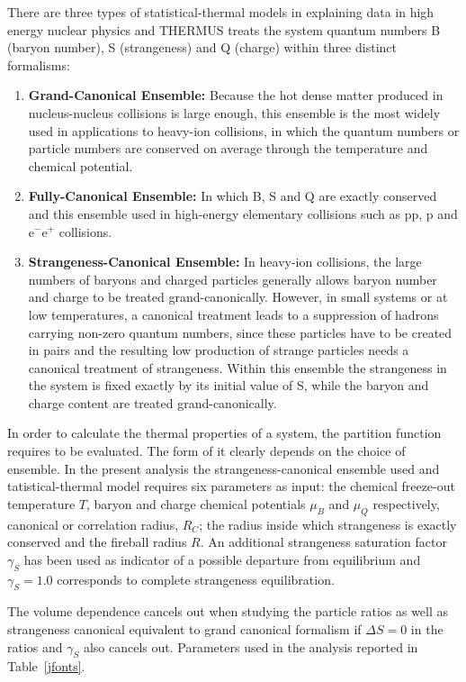 There are three types of statistical-thermal models in explaining data in high energy nuclear physics and THERMUS treats the system quantum numbers B (baryon number), S (strangeness) and Q (charge) within three distinct formalisms: 

\begin{enumerate}
\item \textbf{Grand-Canonical Ensemble:} Because the hot dense matter produced in nucleus-nucleus collisions is large enough, this ensemble is the most widely used in applications to heavy-ion collisions, in which the quantum numbers or particle numbers are conserved on average through the temperature and chemical potential.

\item \textbf{Fully-Canonical Ensemble:} In which B, S and Q are exactly conserved and this ensemble used in high-energy elementary collisions such as pp, p\pbar{} and e$^{-}$e$^{+}$ collisions.

\item \textbf{Strangeness-Canonical Ensemble:} In heavy-ion collisions, the large numbers of baryons and charged particles generally allows baryon number and charge to be treated grand-canonically. However, in small systems or at low temperatures, a canonical treatment leads to a suppression of hadrons carrying non-zero quantum numbers, since these particles have to be created in pairs and the resulting low production of strange particles needs a canonical treatment of strangeness. Within this ensemble the strangeness in the system is fixed exactly by its initial value of S, while the baryon and charge content are treated grand-canonically.


 \end{enumerate}
 In order to calculate the thermal properties of a system, the partition function requires to be evaluated. The form of it clearly depends on the choice of ensemble. 
 In the present analysis the strangeness-canonical ensemble used and tatistical-thermal model requires six parameters as input: the chemical freeze-out temperature $T$, baryon and charge chemical potentials $\mu_{B}$ and $\mu_{Q}$ respectively, canonical or correlation radius, $R_{C}$; the radius inside which strangeness is exactly conserved and the fireball radius $R$. An additional strangeness saturation factor $\gamma_{S}$ has been used as indicator of a possible departure from equilibrium and $\gamma_{S}=1.0$ corresponds to complete strangeness equilibration.
 

The volume dependence cancels out when studying the particle ratios as well as strangeness canonical equivalent to grand canonical formalism if $\Delta S=0$ in the ratios and $\gamma_{S}$ also cancels out. Parameters used in the analysis reported in Table~\ref{jfonts}. %
 
